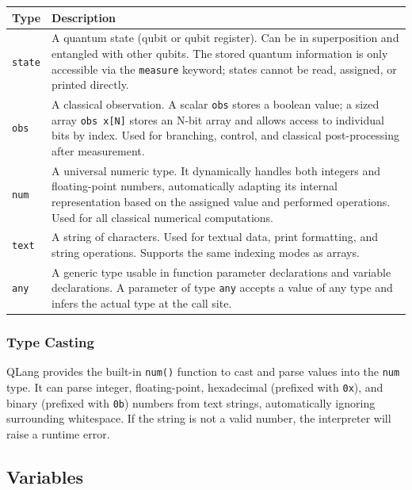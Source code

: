 \begin{center}
\begin{tabular}{|p{2cm}|p{10cm}|}
\hline
\textbf{Type} & \textbf{Description} \\
\hline
\texttt{state} &
    A quantum state (qubit or qubit register). Can be in superposition and
    entangled with other qubits. The stored quantum information is only
    accessible via the \texttt{measure} keyword; states cannot be read,
    assigned, or printed directly. \\
\hline
\texttt{obs} &
    A classical observation. A scalar \texttt{obs} stores a boolean value;
    a sized array \texttt{obs x[N]} stores an N-bit array and allows
    access to individual bits by index. Used for branching, control, and
    classical post-processing after measurement. \\
\hline
\texttt{num} &
    A universal numeric type. It dynamically handles both integers 
    and floating-point numbers, automatically adapting its internal 
    representation based on the assigned value and performed operations. Used 
    for all classical numerical computations. \\
\hline
\texttt{text} &
    A string of characters. Used for textual data, print formatting, and string
    operations. Supports the same indexing modes as arrays. \\
\hline
\texttt{any} &
    A generic type usable in function parameter declarations and variable
    declarations. A parameter of type \texttt{any} accepts a value of any type
    and infers the actual type at the call site. \\
\hline
\end{tabular}
\end{center}

\newpage
\subsubsection{Type Casting}

QLang provides the built-in \texttt{num()} function to cast and parse values into the \texttt{num} type. It can parse integer, floating-point, hexadecimal (prefixed with \texttt{0x}), and binary (prefixed with \texttt{0b}) numbers from text strings, automatically ignoring surrounding whitespace. If the string is not a valid number, the interpreter will raise a runtime error.


\subsection{Variables}\label{sec:variables}

